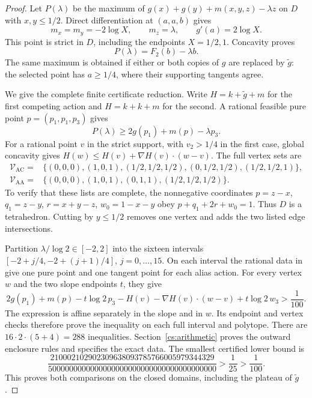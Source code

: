 \begin{proof}
Let $P(\lambda)$ be the maximum of $g(x)+g(y)+m(x,y,z)-\lambda z$ on $D$ with $x,y\le1/2$. Direct differentiation at $(a,a,b)$ gives
\[
 m_x=m_y=-2\log X,\qquad m_z=\lambda,\qquad g'(a)=2\log X.
\]
This point is strict in $D$, including the endpoints $X=1/2,1$. Concavity proves
\[
 P(\lambda)=F_2(b)-\lambda b.
\]
The same maximum is obtained if either or both copies of $g$ are replaced by $\widetilde g$: the selected point has $a\ge1/4$, where their supporting tangents agree.

We give the complete finite certificate reduction. Write $H=k+\widetilde g+m$ for the first competing action and $H=k+k+m$ for the second. A rational feasible pure point $p=(p_1,p_1,p_3)$ gives
\[
 P(\lambda)\ge 2g(p_1)+m(p)-\lambda p_3.
\]
For a rational point $v$ in the strict support, with $v_2>1/4$ in the first case, global concavity gives
$H(w)\le H(v)+\nabla H(v)\cdot(w-v)$. The full vertex sets are
\begin{align*}
 \mathcal V_{\mathrm{AC}}={}&
 \{(0,0,0),(1,0,1),(1/2,1/2,1/2),(0,1/2,1/2),(1/2,1/2,1)\},\\
 \mathcal V_{\mathrm{AA}}={}&
 \{(0,0,0),(1,0,1),(0,1,1),(1/2,1/2,1/2)\}.
\end{align*}
To verify that these lists are complete, the nonnegative coordinates
$p=z-x$, $q_1=z-y$, $r=x+y-z$, $w_0=1-x-y$ obey
$p+q_1+2r+w_0=1$. Thus $D$ is a tetrahedron. Cutting by $y\le1/2$ removes one vertex and adds the two listed edge intersections.

Partition $\lambda/\log2\in[-2,2]$ into the sixteen intervals
$[-2+j/4,-2+(j+1)/4]$, $j=0,\ldots,15$. On each interval the rational data in \cite{Certificates} give one pure point and one tangent point for each alias action. For every vertex $w$ and the two slope endpoints $t$, they give
\begin{equation}\label{cs:two-certificate}
 2g(p_1)+m(p)-t\log2\,p_3
 -H(v)-\nabla H(v)\cdot(w-v)+t\log2\,w_3>\frac1{100}.
\end{equation}
The expression is affine separately in the slope and in $w$. Its endpoint and vertex checks therefore prove the inequality on each full interval and polytope. There are $16\cdot2\cdot(5+4)=288$ inequalities. Section~\ref{cs:arithmetic} proves the outward enclosure rules and specifies the exact data. The smallest certified lower bound is
\begin{equation}\label{cs:two-margin}
 \frac{210002102902309638093785766005979344329}
 {5000000000000000000000000000000000000000}
 >\frac1{25}>\frac1{100}.
\end{equation}
This proves both comparisons on the closed domains, including the plateau of $\widetilde g$.
\end{proof}

